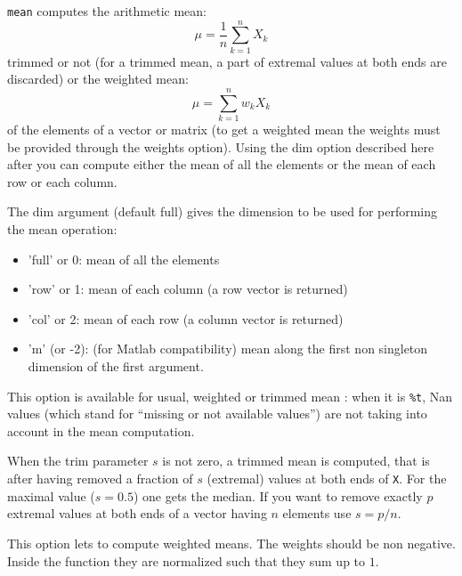 \begin{mandescription}
  \verb+mean+ computes the arithmetic mean:
$$
    \mu = \frac{1}{n} \sum_{k=1}^n X_k 
$$ 
trimmed or not (for a trimmed mean, a part of extremal values at both ends are discarded) 
or the weighted mean:
$$
    \mu = \sum_{k=1}^n w_k X_k 
$$
of the elements of a vector or matrix (to get a weighted mean the weights must be provided
through the weights option). Using the dim option described here after you can compute either
the mean of all the elements or the mean of each row or each column. 

  The dim argument (default full) gives the dimension to be used for performing the mean operation:
  \begin{itemize}
    \item 'full' or 0: mean of all the elements 
    \item 'row' or 1: mean of each column (a row vector is returned)
    \item 'col' or 2: mean of each row (a column vector is returned)
    \item 'm' (or -2): (for Matlab compatibility) mean along the first non 
          singleton dimension of the first argument.
  \end{itemize}

   This option is available for usual, weighted or trimmed mean : when it is \verb+%t+,  Nan values 
  (which stand for ``missing or not available values'') are not taking into account in the
   mean computation.

  When the trim parameter $s$ is not zero, a trimmed mean is computed, that is
  after having removed a fraction of $s$ (extremal) values at both ends of \verb+X+. For
  the maximal value ($s=0.5$) one gets the median. If you want to remove exactly $p$
  extremal values at both ends of a vector having $n$ elements use $s = p/n$.  
   
  This option lets to compute weighted means. The weights should be non negative. Inside
the function they are normalized such that they sum up to $1$.

\end{mandescription}
